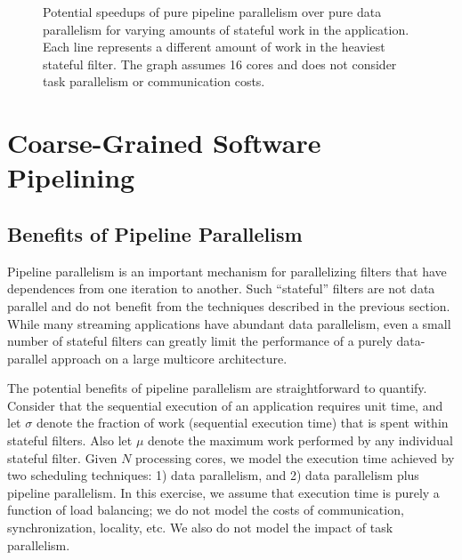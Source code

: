 \begin{figure}[t]
\begin{center}
\vspace{-8pt}
\end{center}
\caption{Potential speedups of pure pipeline parallelism over pure
data parallelism for varying amounts of stateful work in the
application.  Each line represents a different amount of work in the
heaviest stateful filter.  The graph assumes 16 cores and does not
consider task parallelism or communication costs.
\protect\label{fig:model-speedup}}
\end{figure}

\section{Coarse-Grained Software Pipelining}
\label{sec:softpipe}

\subsection{Benefits of Pipeline Parallelism}
\label{sec:pipeline-model}

Pipeline parallelism is an important mechanism for parallelizing
filters that have dependences from one iteration to another.  Such
``stateful'' filters are not data parallel and do not benefit from the
techniques described in the previous section.  While many streaming
applications have abundant data parallelism, even a small number of
stateful filters can greatly limit the performance of a purely
data-parallel approach on a large multicore architecture.

The potential benefits of pipeline parallelism are straightforward to
quantify.  Consider that the sequential execution of an application
requires unit time, and let $\sigma$ denote the fraction of work
(sequential execution time) that is spent within stateful filters.
Also let $\mu$ denote the maximum work performed by any individual
stateful filter.  Given $N$ processing cores, we model the execution
time achieved by two scheduling techniques: 1) data parallelism, and
2) data parallelism plus pipeline parallelism.  In this exercise, we
assume that execution time is purely a function of load balancing; we
do not model the costs of communication, synchronization, locality,
etc.  We also do not model the impact of task parallelism.

